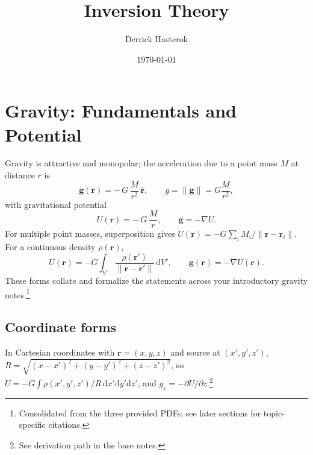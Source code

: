 \documentclass[11pt,a4paper]{article}
\title{Inversion Theory}
\author{Derrick Hasterok}
\date{\today}
\begin{document}
\maketitle

\section{Gravity: Fundamentals and Potential}
Gravity is attractive and monopolar; the acceleration due to a point mass $M$ at distance $r$ is
\begin{equation}
  \mathbf{g}(\mathbf{r}) = -\,G\,\frac{M}{r^2}\,\hat{\mathbf{r}},\qquad g=\|\mathbf{g}\|=G\frac{M}{r^2},
\end{equation}
with gravitational potential
\begin{equation}
  U(\mathbf{r}) = -\,G\,\frac{M}{r},\qquad \mathbf{g} = -\nabla U.
\end{equation}
For multiple point masses, superposition gives $U(\mathbf{r})=-G\sum_i M_i/\|\mathbf{r}-\mathbf{r}_i\|$. For a continuous density $\rho(\mathbf{r})$, 
\begin{equation}
  U(\mathbf{r}) = -G\int_{V'} \frac{\rho(\mathbf{r'})}{\|\mathbf{r}-\mathbf{r'}\|}\,\mathrm{d}V',\qquad \mathbf{g}(\mathbf{r}) = -\nabla U(\mathbf{r}).
\end{equation}
These forms collate and formalize the statements across your introductory gravity notes.\footnote{Consolidated from the three provided PDFs; see later sections for topic-specific citations.}

\subsection{Coordinate forms}
In Cartesian coordinates with $\mathbf{r}=(x,y,z)$ and source at $(x',y',z')$,
$R=\sqrt{(x-x')^2+(y-y')^2+(z-z')^2}$, so 
$U=-G\int \rho(x',y',z')/R\,\mathrm{d}x'\mathrm{d}y'\mathrm{d}z'$, and $g_z=-\partial U/\partial z$.\footnote{See derivation path in the base notes.}
\end{document}
